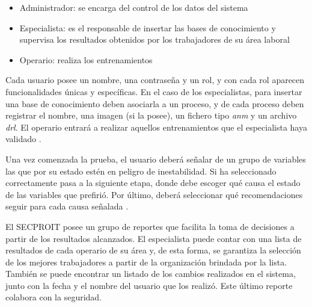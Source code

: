 \begin{itemize}
\item Administrador: se encarga del control de los datos del sistema
\item Especialista: es el responsable de insertar las bases de conocimiento y supervisa los resultados obtenidos por los trabajadores de su área laboral
\item Operario: realiza los entrenamientos
\end{itemize}

Cada usuario posee un nombre, una contraseña y un rol, y con cada rol aparecen funcionalidades únicas y específicas. En el caso de los especialistas, para insertar una base de conocimiento deben asociarla a un proceso, y de cada proceso deben registrar el nombre, una imagen (si la posee), un fichero tipo \textsl{anm} y un archivo \textsl{drl}. El operario entrará a realizar aquellos entrenamientos que el especialista haya validado \cite{Lemus2018}.

Una vez comenzada la prueba, el usuario deberá señalar de un grupo de variables las que por su estado estén en peligro de inestabilidad. Si ha seleccionado correctamente pasa a la siguiente etapa, donde debe escoger qué causa el estado de las variables que prefirió. Por último, deberá seleccionar qué recomendaciones seguir para cada causa señalada \cite{ElenaAcostaGil2018}.

El SECPROIT posee un grupo de reportes que facilita la toma de decisiones a partir de los resultados alcanzados. El especialista puede contar con una lista de resultados de cada operario de su área y, de esta forma, se garantiza la selección de los mejores trabajadores a partir de la organización brindada por la lista. También se puede encontrar un listado de los cambios realizados en el sistema, junto con la fecha y el nombre del usuario que los realizó. Este último reporte colabora con la seguridad.

